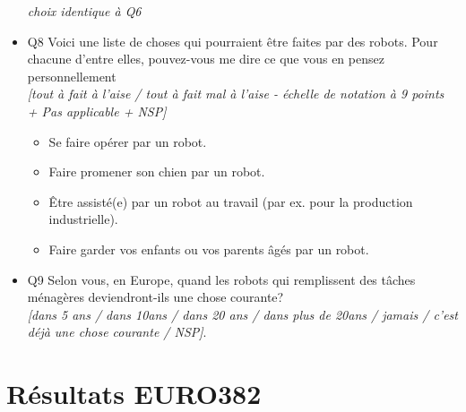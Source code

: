\begin{itemize}
  \textit{choix identique à Q6}\\
  \item Q8 Voici une liste de choses qui pourraient être faites par des robots. Pour chacune d’entre elles, pouvez-vous me dire ce que vous en pensez personnellement\\
  \textit{[tout à fait à l'aise / tout à fait mal à l'aise - échelle de notation à 9 points + Pas applicable + NSP]}
    \begin{itemize}
    \item Se faire opérer par un robot.
    \item Faire promener son chien par un robot.
    \item Être assisté(e) par un robot au travail (par ex. pour la production industrielle).
    \item Faire garder vos enfants ou vos parents âgés par un robot.\\
    \end{itemize}
  \item Q9 Selon vous, en Europe, quand les robots qui remplissent des tâches ménagères deviendront-ils une chose courante?\\
  \textit{[dans 5 ans / dans 10ans / dans 20 ans / dans plus de 20ans / jamais / c'est déjà une chose courante / NSP]}.
\end{itemize}

\section{Résultats EURO382}\label{pdf:euro_result}


\vfill\strut







